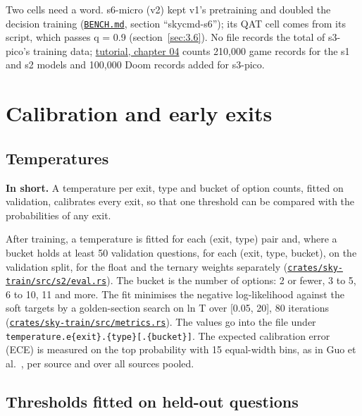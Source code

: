 \documentclass[10pt]{article}
\begin{document}
Two cells need a word. s6-micro (v2) kept v1's pretraining and doubled the decision training (\href{https://github.com/maxgfr/skycmd/blob/main/BENCH.md}{\texttt{BENCH.md}}, section ``skycmd-s6''); its QAT cell comes from its script, which passes q = 0.9 (section~\ref{sec:3.6}). No file records the total of s3-pico's training data; \href{https://maxgfr.github.io/skycmd/tutorial/04-game-cores-and-oracles}{tutorial, chapter 04} counts 210,000 game records for the s1 and s2 models and 100,000 Doom records added for s3-pico.

\section{Calibration and early exits}\label{sec:5}

\subsection{Temperatures}\label{sec:5.1}

\textbf{In short.} A temperature per exit, type and bucket of option counts, fitted on validation, calibrates every exit, so that one threshold can be compared with the probabilities of any exit.

After training, a temperature is fitted for each (exit, type) pair and, where a bucket holds at least 50 validation questions, for each (exit, type, bucket), on the validation split, for the float and the ternary weights separately (\href{https://github.com/maxgfr/skycmd/blob/main/crates/sky-train/src/s2/eval.rs}{\texttt{crates/\allowbreak{}sky-train/\allowbreak{}src/\allowbreak{}s2/\allowbreak{}eval.rs}}). The bucket is the number of options: 2 or fewer, 3 to 5, 6 to 10, 11 and more. The fit minimises the negative log-likelihood against the soft targets by a golden-section search on ln T over [0.05, 20], 80 iterations (\href{https://github.com/maxgfr/skycmd/blob/main/crates/sky-train/src/metrics.rs}{\texttt{crates/\allowbreak{}sky-train/\allowbreak{}src/\allowbreak{}metrics.rs}}). The values go into the file under \texttt{temperature.e\{exit\}.\{type\}[.\{bucket\}]}. The expected calibration error (ECE) is measured on the top probability with 15 equal-width bins, as in Guo et al.~\cite{guo2017calibration}, per source and over all sources pooled.

\subsection{Thresholds fitted on held-out questions}\label{sec:5.2}
\end{document}
